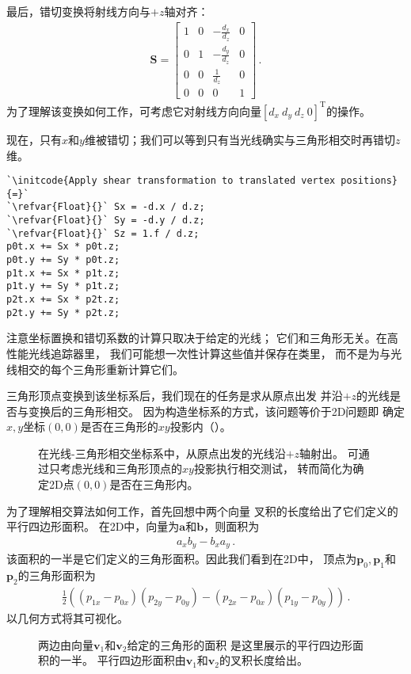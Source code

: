 最后，错切变换将射线方向与$+z$轴对齐：
\begin{align*}
    \bm S=\left[\begin{array}{rrrr}
            1 & 0 & \displaystyle-\frac{d_x}{d_z} & 0 \\
            0 & 1 & \displaystyle-\frac{d_y}{d_z} & 0 \\
            0 & 0 & \displaystyle\frac{1}{d_z}    & 0 \\
            0 & 0 & 0                             & 1
        \end{array}\right]\, .
\end{align*}
为了理解该变换如何工作，可考虑它对射线方向向量$[d_x\ d_y\ d_z\ 0]^{\mathrm{T}}$的操作。

现在，只有$x$和$y$维被错切；我们可以等到只有当光线确实与三角形相交时再错切$z$维。
\begin{lstlisting}
`\initcode{Apply shear transformation to translated vertex positions}{=}`
`\refvar{Float}{}` Sx = -d.x / d.z;
`\refvar{Float}{}` Sy = -d.y / d.z;
`\refvar{Float}{}` Sz = 1.f / d.z;
p0t.x += Sx * p0t.z;
p0t.y += Sy * p0t.z;
p1t.x += Sx * p1t.z;
p1t.y += Sy * p1t.z;
p2t.x += Sx * p2t.z;
p2t.y += Sy * p2t.z;
\end{lstlisting}

注意坐标置换和错切系数的计算只取决于给定的光线；
它们和三角形无关。在高性能光线追踪器里，
我们可能想一次性计算这些值并保存在类里，
而不是为与光线相交的每个三角形重新计算它们。

三角形顶点变换到该坐标系后，我们现在的任务是求从原点出发
并沿$+z$的光线是否与变换后的三角形相交。
因为构造坐标系的方式，该问题等价于2D问题即
确定$x,y$坐标$(0,0)$是否在三角形的$xy$投影内（）。
\begin{figure}[htbp]
    \centering
    \caption{在光线-三角形相交坐标系中，从原点出发的光线沿$+z$轴射出。
        可通过只考虑光线和三角形顶点的$xy$投影执行相交测试，
        转而简化为确定2D点$(0,0)$是否在三角形内。}
    \label{fig:3.12}
\end{figure}

为了理解相交算法如何工作，首先回想中两个向量
叉积的长度给出了它们定义的平行四边形面积。
在2D中，向量为$\bm a$和$\bm b$，则面积为
\begin{align*}
    a_xb_y-b_xa_y\, .
\end{align*}
该面积的一半是它们定义的三角形面积。因此我们看到在2D中，
顶点为$\bm p_0,\bm p_1$和$\bm p_2$的三角形面积为
\begin{align*}
    \frac{1}{2}((p_{1x}-p_{0x})(p_{2y}-p_{0y})-(p_{2x}-p_{0x})(p_{1y}-p_{0y}))\, .
\end{align*}
以几何方式将其可视化。
\begin{figure}[htbp]
    \centering
    \caption{两边由向量$\bm v_1$和$\bm v_2$给定的三角形的面积
        是这里展示的平行四边形面积的一半。
        平行四边形面积由$\bm v_1$和$\bm v_2$的叉积长度给出。}
    \label{fig:3.13}
\end{figure}

